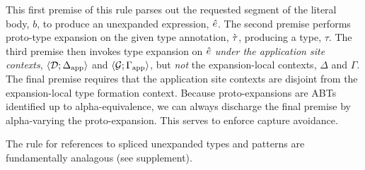 \documentclass[acmsmall,review,anonymous]{acmart}\settopmatter{printfolios=true,printccs=false,printacmref=false}
\begin{document}

\noindent
This first premise of this rule parses out the requested segment of the literal body, $b$, to produce an unexpanded expression, ${\hat e}$. The second premise performs proto-type expansion on the given type annotation, $\grave{\tau}$, producing a type, $\tau$. The third premise then invokes type expansion on ${\hat e}$ \emph{under the application site contexts}, $\langle \mathcal{D}; \Delta_\text{app} \rangle$ and $\langle \mathcal{G}; \Gamma_\text{app} \rangle$, but \emph{not} the expansion-local contexts, $\Delta$ and $\Gamma$.  The final premise requires that the application site contexts are disjoint from the expansion-local type formation context. Because proto-expansions are ABTs identified up to alpha-equivalence, we can always discharge the final premise by alpha-varying the proto-expansion. This serves to enforce capture avoidance. %

The rule for references to spliced unexpanded types and patterns are fundamentally analagous (see supplement). 



\end{document}
